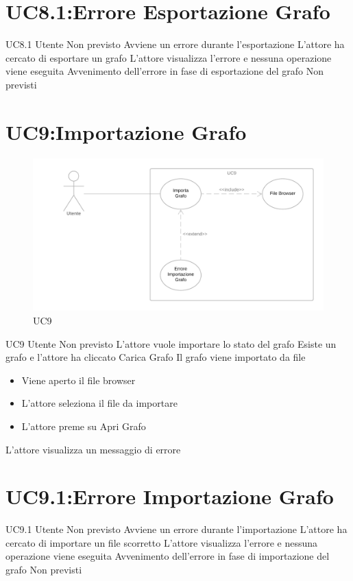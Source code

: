 \documentclass[../AnalisideiRequisiti.tex]{subfiles}
\begin{document}
\section{UC8.1:Errore Esportazione Grafo}
\UserCase
{UC8.1}
{Utente}
{Non previsto}
{Avviene un errore durante l'esportazione}
{L'attore ha cercato di esportare un grafo}
{L'attore visualizza l'errore e nessuna operazione viene eseguita}
{Avvenimento dell'errore in fase di esportazione del grafo}
{Non previsti}

\section{UC9:Importazione Grafo}
\begin{figure}[H]
	\caption{UC9}
	\centering
	\includegraphics[width=\textwidth]{../img/UC09.png}
\end{figure}
\UserCase
{UC9}
{Utente}
{Non previsto}
{L'attore vuole importare lo stato del grafo}
{Esiste un grafo e l'attore ha cliccato Carica Grafo}
{Il grafo viene importato da file}
{
	\begin{itemize}
			\item{} Viene aperto il file browser
			\item{} L'attore seleziona il file da importare
			\item{} L'attore preme su Apri Grafo
	\end{itemize}
}
{L'attore visualizza un messaggio di errore }
\section{UC9.1:Errore Importazione Grafo}
\UserCase
{UC9.1}
{Utente}
{Non previsto}
{Avviene un errore durante l'importazione}
{L'attore ha cercato di importare un file scorretto}
{L'attore visualizza l'errore e nessuna operazione viene eseguita}
{Avvenimento dell'errore in fase di importazione del grafo}
{Non previsti}
\end{document}
